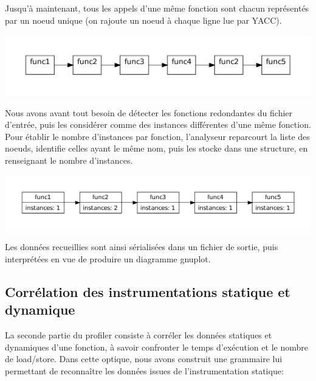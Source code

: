 Jusqu'à maintenant, tous les appels d'une même fonction sont chacun représentés par un noeud unique (on rajoute un noeud à chaque ligne lue par YACC).\\

\begin{center}
	\includegraphics[scale=0.50]{images/liste1}
\end{center}

Nous avons avant tout besoin de détecter les fonctions redondantes du fichier d'entrée, puis les considérer comme des instances différentes d'une même fonction.\\

Pour établir le nombre d'instances par fonction, l'analyseur reparcourt la liste des noeuds, identifie celles ayant le même nom, puis les stocke dans une structure, en renseignant le nombre d'instances.\\

\begin{center}
	\includegraphics[scale=0.50]{images/ListIntances}
\end{center}

Les données recueillies sont ainsi sérialisées dans un fichier de sortie, puis interprétées en vue de produire un diagramme gnuplot.\\

\subsection{Corrélation des instrumentations statique et dynamique}

La seconde partie du profiler consiste à corréler les données statiques et dynamiques d'une fonction, à savoir confronter le temps d'exécution et le nombre de load/store. Dans cette optique, nous avons construit une grammaire lui permettant de reconnaître les données issues de l'instrumentation statique:

